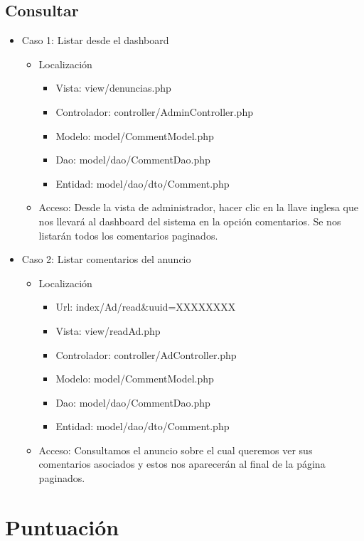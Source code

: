 \subsection{Consultar}
\begin{itemize}
\item Caso 1: Listar desde el dashboard
\begin{itemize}
\item Localizaci\'{o}n
\begin{itemize}
\item Vista: view/denuncias.php
\item Controlador: controller/AdminController.php
\item Modelo: model/CommentModel.php
\item Dao: model/dao/CommentDao.php
\item Entidad: model/dao/dto/Comment.php
\end{itemize}
\item Acceso: Desde la vista de administrador, hacer clic en la llave inglesa que nos llevar\'{a} al dashboard del sistema en la opci\'{o}n comentarios. Se nos listar\'{a}n todos los comentarios paginados.
\end{itemize}
\item Caso 2: Listar comentarios del anuncio
\begin{itemize}
\item Localizaci\'{o}n
\begin{itemize}
\item Url: index/Ad/read\&uuid=XXXXXXXX
\item Vista: view/readAd.php
\item Controlador: controller/AdController.php
\item Modelo: model/CommentModel.php
\item Dao: model/dao/CommentDao.php
\item Entidad: model/dao/dto/Comment.php
\end{itemize}
\item Acceso: Consultamos el anuncio sobre el cual queremos ver sus comentarios asociados y estos nos aparecer\'{a}n al final de la p\'{a}gina paginados.
\end{itemize}
\end{itemize}

\section{Puntuaci\'{o}n}

